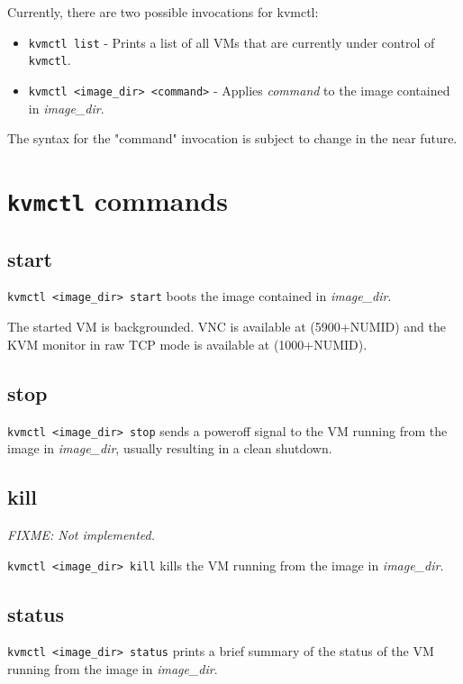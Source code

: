 \documentclass[11pt]{article}
\begin{document}
Currently, there are two possible invocations for kvmctl:

\begin{itemize}
\item \texttt{kvmctl list} - Prints a list of all VMs that are currently under control of \texttt{kvmctl}.
\item \texttt{kvmctl <image_dir> <command>} - Applies \emph{command} to the image contained in \emph{image_dir}.
\end{itemize}

The syntax for the "command" invocation is subject to change in the near future.

\section{\texttt{kvmctl} commands}

\subsection{start}

\texttt{kvmctl <image_dir> start} boots the image contained in \emph{image_dir}.

The started VM is backgrounded. VNC is available at (5900+NUMID) and the KVM monitor in raw TCP mode is available at 
(1000+NUMID).

\subsection{stop}

\texttt{kvmctl <image_dir> stop} sends a poweroff signal to the VM running from the image in \emph{image_dir},
usually resulting in a clean shutdown. 

\subsection{kill}

\emph{FIXME: Not implemented.}

\texttt{kvmctl <image_dir> kill} kills the VM running from the image in \emph{image_dir}. 

\subsection{status}

\texttt{kvmctl <image_dir> status} prints a brief summary of the status of the VM running from the image in \emph{image_dir}.
\end{document}
